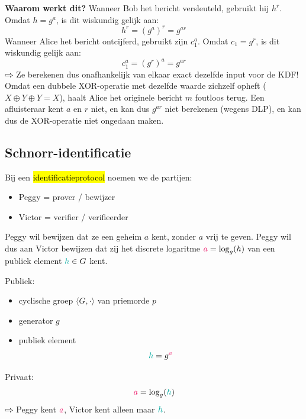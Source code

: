 \begin{center}
\resizebox{0.9\textwidth}{!}{%
    
}
\end{center}

\textbf{Waarom werkt dit?}  \newline
Wanneer Bob het bericht versleuteld, gebruikt hij $h^r$. Omdat $h = g^a$, is dit wiskundig gelijk aan:
\begin{equation*}
    h^r = \left(g^a\right)^r = g^{ar}
\end{equation*}
Wanneer Alice het bericht ontcijferd, gebruikt zijn $c_1^a$. Omdat $c_1 = g^r$, is dit wiskundig gelijk aan:
\begin{equation*}
    c_1^a = \left(g^r\right)^a = g^{ar}
\end{equation*}
$\rightwhitearrow$ Ze berekenen dus onafhankelijk van elkaar exact dezelfde input voor de KDF! Omdat een dubbele XOR-operatie met dezelfde waarde zichzelf opheft ($X \oplus Y \oplus Y = X$), haalt Alice het originele bericht $m$ foutloos terug.
Een afluisteraar kent $a$ en $r$ niet, en kan dus $g^{ar}$ niet berekenen (wegens DLP), en kan dus de XOR-operatie niet ongedaan maken.

\subsection{Schnorr-identificatie}\label{sec:l7_schnorr}

Bij een \hl{identificatieprotocol} noemen we de partijen:
\begin{itemize}
    \item Peggy = prover / bewijzer
    \item Victor = verifier / verifieerder
\end{itemize}
Peggy wil bewijzen dat ze  een \textcolor{WildStrawberry}{geheim $a$} kent, zonder \textcolor{WildStrawberry}{$a$} vrij te geven. Peggy wil dus aan Victor bewijzen dat zij  het discrete logaritme $\textcolor{WildStrawberry}{a} = \log_g (h)$ van een \textcolor{Emerald}{publiek element} $\textcolor{Emerald}{h} \in G$ kent.


Publiek:
\begin{itemize}
    \item cyclische groep $\langle G, \cdot \rangle$ van priemorde $p$
    \item generator $g$
    \item \textcolor{Emerald}{publiek element}
    \begin{equation*}
        \textcolor{Emerald}{h} = g^{\textcolor{WildStrawberry}{a}}
    \end{equation*}
\end{itemize}
Privaat:
\begin{equation*}
    \textcolor{WildStrawberry}{a} = \log_g(\textcolor{Emerald}{h})
\end{equation*}
$\rightwhitearrow$ Peggy kent $\textcolor{WildStrawberry}{a}$, Victor kent alleen maar $\textcolor{Emerald}{h}$. 

